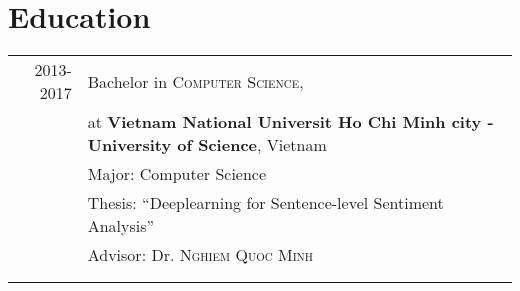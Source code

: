 \documentclass[a4paper,10pt]{article}
\begin{document}
\section{Education}
\begin{tabular}{rl}	

\textsc{2013-2017} & Bachelor in \textsc{Computer Science},\\ &at \textbf{Vietnam National Universit Ho Chi Minh city - University of Science}, Vietnam\\
& Major: Computer Science\\
& Thesis: ``Deeplearning for Sentence-level Sentiment Analysis'' \\
& \small Advisor: Dr. \textsc{Nghiem Quoc Minh}\\
&\normalsize \\&\\


\end{tabular} %
\end{document}
